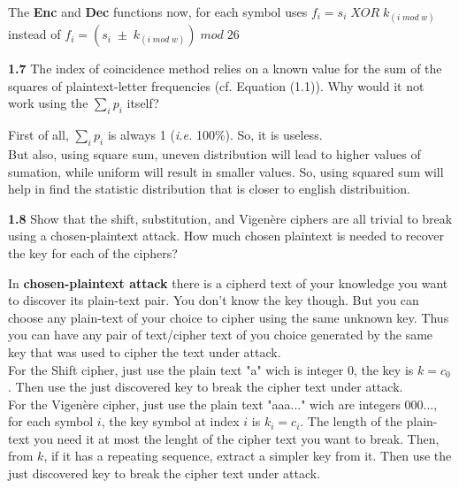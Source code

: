The \textbf{Enc} and \textbf{Dec}  functions now, for each symbol uses \(f_i = s_i \; XOR \; k_{(i \; mod \; w)}\) instead of   \(f_i = (s_i \; \pm \; k_{(i \; mod \; w)}) \; mod \; 26\)

\vspace{1em}
\noindent
\textbf{1.7} \hspace{1em} The index of coincidence method relies on a known value for the sum
of the squares of plaintext-letter frequencies (cf. Equation (1.1)). Why would it not work using the \( \sum_{i} p_i \) itself?
\vspace{1em}

First of all, \( \sum_{i} p_i \) is always 1 (\textit{i.e.} 100\%). So, it is useless.\\

But also, using square sum, uneven distribution will lead to higher values of sumation, while uniform will result in smaller values. So, using squared sum will help in find the statistic distribution that is closer to english distribuition.

\vspace{1em}
\noindent
\textbf{1.8} \hspace{1em} Show that the shift, substitution, and Vigenère ciphers are all trivial to break using a chosen-plaintext attack. How much chosen plaintext is needed to recover the key for each of the ciphers?
\vspace{1em}

In \textbf{chosen-plaintext attack} there is a cipherd text of your knowledge you want to discover its plain-text pair. You don't know the key though. But you can choose any plain-text of your choice to cipher using the same unknown key. Thus you can have any pair of text/cipher text of you choice generated by the same key that was used to cipher the text under attack.\\

For the Shift cipher, just use the plain text "a"  wich is integer 0, the key is \(k = c_0\). Then use the just discovered key to break the cipher text under attack.\\

For the Vigenère cipher, just use the plain text "aaa..."  wich are integers 000..., for each symbol \(i\), the key symbol at index \(i\) is \(k_i = c_i \). The length of the plain-text you need it at most the lenght of the cipher text you want to break. Then, from \(k\), if it has a repeating sequence, extract a simpler key from it. Then use the just discovered key to break the cipher text under attack.

